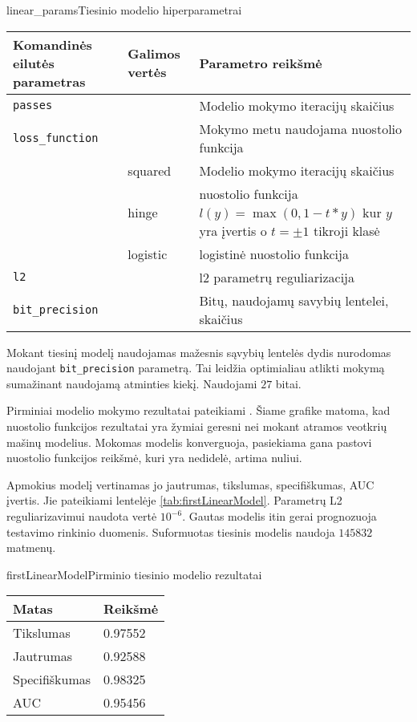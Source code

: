 \begin{ktutable}{linear_params}{Tiesinio modelio hiperparametrai}
    \begin{tabular}{| l | l | p{7cm}|}
    \hline
        Komandinės eilutės parametras & Galimos vertės & Parametro reikšmė\\ \hline
        \texttt{passes} &  & Modelio mokymo iteracijų skaičius \\ \hline
        \texttt{loss\_function} &          & Mokymo metu naudojama nuostolio funkcija \\
                               & squared  & Modelio mokymo iteracijų skaičius \\
                               & hinge    & nuostolio funkcija $l(y) = \max(0, 1 - t * y)$ kur $y$ yra įvertis o $t = \pm 1$ tikroji klasė  \\
                               & logistic & logistinė nuostolio funkcija \\ \hline
        \texttt{l2} & & l2 parametrų reguliarizacija \\ \hline
        \texttt{bit\_precision} & & Bitų, naudojamų savybių lentelei, skaičius\\ \hline
    \end{tabular}
\end{ktutable}

Mokant tiesinį modelį naudojamas mažesnis sąvybių lentelės dydis nurodomas naudojant \texttt{bit\_precision} parametrą. Tai leidžia optimialiau atlikti mokymą sumažinant naudojamą atminties kiekį. Naudojami $27$ bitai.

Pirminiai modelio mokymo rezultatai pateikiami . Šiame grafike matoma, kad nuostolio funkcijos rezultatai yra žymiai geresni nei mokant atramos veotkrių mašinų modelius. Mokomas modelis konverguoja, pasiekiama gana pastovi nuostolio funkcijos reikšmė, kuri yra nedidelė, artima nuliui.


Apmokius modelį vertinamas jo jautrumas, tikslumas, specifiškumas, AUC įvertis. Jie pateikiami lentelėje \vref{tab:firstLinearModel}. Parametrų L2 reguliarizavimui naudota vertė $10^{-6}$.
Gautas modelis itin gerai prognozuoja testavimo rinkinio duomenis. Suformuotas tiesinis modelis naudoja
$145832$ matmenų.

\begin{ktutable}{firstLinearModel}{Pirminio tiesinio modelio rezultatai}
    \begin{tabular}{| l | l |}
    \hline
       Matas & Reikšmė \\ \hline
               Tikslumas & 0.97552 \\ \hline
               Jautrumas & 0.92588 \\ \hline
               Specifiškumas & 0.98325 \\ \hline
               AUC & 0.95456 \\ \hline
    \end{tabular}
\end{ktutable}

